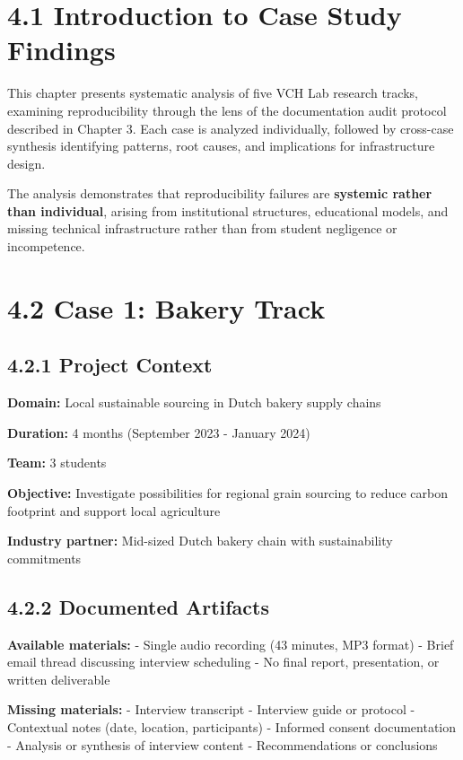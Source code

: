 \documentclass[
  oneside,
  open=any]{scrbook}
\begin{document}
\section{4.1 Introduction to Case Study
Findings}\label{introduction-to-case-study-findings}

This chapter presents systematic analysis of five VCH Lab research
tracks, examining reproducibility through the lens of the documentation
audit protocol described in Chapter 3. Each case is analyzed
individually, followed by cross-case synthesis identifying patterns,
root causes, and implications for infrastructure design.

The analysis demonstrates that reproducibility failures are
\textbf{systemic rather than individual}, arising from institutional
structures, educational models, and missing technical infrastructure
rather than from student negligence or incompetence.

\section{4.2 Case 1: Bakery Track}\label{case-1-bakery-track}

\subsection{4.2.1 Project Context}\label{project-context}

\textbf{Domain:} Local sustainable sourcing in Dutch bakery supply
chains

\textbf{Duration:} 4 months (September 2023 - January 2024)

\textbf{Team:} 3 students

\textbf{Objective:} Investigate possibilities for regional grain
sourcing to reduce carbon footprint and support local agriculture

\textbf{Industry partner:} Mid-sized Dutch bakery chain with
sustainability commitments

\subsection{4.2.2 Documented Artifacts}\label{documented-artifacts}

\textbf{Available materials:} - Single audio recording (43 minutes, MP3
format) - Brief email thread discussing interview scheduling - No final
report, presentation, or written deliverable

\textbf{Missing materials:} - Interview transcript - Interview guide or
protocol - Contextual notes (date, location, participants) - Informed
consent documentation - Analysis or synthesis of interview content -
Recommendations or conclusions
\end{document}
